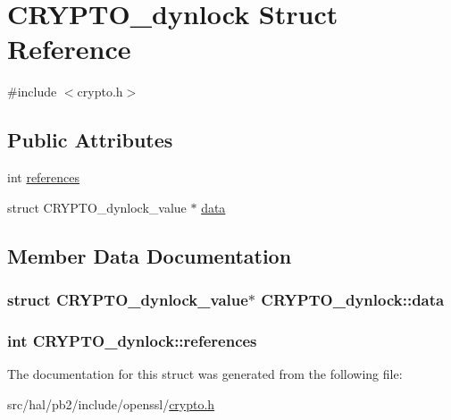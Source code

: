 \hypertarget{struct_c_r_y_p_t_o__dynlock}{}\section{C\+R\+Y\+P\+T\+O\+\_\+dynlock Struct Reference}
\label{struct_c_r_y_p_t_o__dynlock}


{\ttfamily \#include $<$crypto.\+h$>$}

\subsection*{Public Attributes}
\begin{DoxyCompactItemize}
\item 
int \hyperlink{struct_c_r_y_p_t_o__dynlock_a5a29cc97b740faafbfc38aeb9b8e490d}{references}
\item 
struct C\+R\+Y\+P\+T\+O\+\_\+dynlock\+\_\+value $\ast$ \hyperlink{struct_c_r_y_p_t_o__dynlock_ac80047787eba227e04a56ec05ea5e0f2}{data}
\end{DoxyCompactItemize}


\subsection{Member Data Documentation}
\subsubsection[{\texorpdfstring{data}{data}}]{\setlength{\rightskip}{0pt plus 5cm}struct C\+R\+Y\+P\+T\+O\+\_\+dynlock\+\_\+value$\ast$ C\+R\+Y\+P\+T\+O\+\_\+dynlock\+::data}\hypertarget{struct_c_r_y_p_t_o__dynlock_ac80047787eba227e04a56ec05ea5e0f2}{}\label{struct_c_r_y_p_t_o__dynlock_ac80047787eba227e04a56ec05ea5e0f2}
\subsubsection[{\texorpdfstring{references}{references}}]{\setlength{\rightskip}{0pt plus 5cm}int C\+R\+Y\+P\+T\+O\+\_\+dynlock\+::references}\hypertarget{struct_c_r_y_p_t_o__dynlock_a5a29cc97b740faafbfc38aeb9b8e490d}{}\label{struct_c_r_y_p_t_o__dynlock_a5a29cc97b740faafbfc38aeb9b8e490d}


The documentation for this struct was generated from the following file\+:\begin{DoxyCompactItemize}
\item 
src/hal/pb2/include/openssl/\hyperlink{crypto_8h}{crypto.\+h}\end{DoxyCompactItemize}
